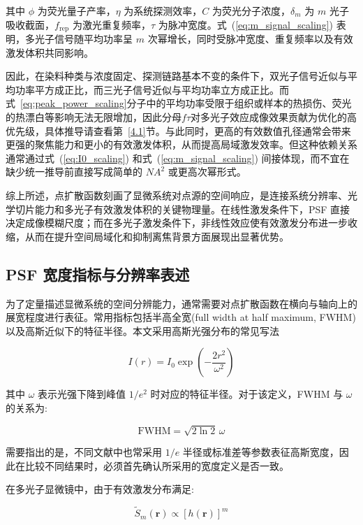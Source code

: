 其中 $\phi$ 为荧光量子产率，$\eta$ 为系统探测效率，$C$ 为荧光分子浓度，$\delta_m$ 为 $m$ 光子吸收截面，$f_{\mathrm{rep}}$ 为激光重复频率，$\tau$ 为脉冲宽度。式~(\ref{eq:m_signal_scaling}) 表明，多光子信号随平均功率呈 $m$ 次幂增长，同时受脉冲宽度、重复频率以及有效激发体积共同影响。

因此，在染料种类与浓度固定、探测链路基本不变的条件下，双光子信号近似与平均功率平方成正比，而三光子信号近似与平均功率立方成正比。而式~\ref{eq:peak_power_scaling}分子中的平均功率受限于组织或样本的热损伤、荧光的热漂白等影响无法无限增加，因此分母$f\tau$对多光子效应成像效果贡献为优化的高优先级，具体推导请查看第~\ref{4.1}节。与此同时，更高的有效数值孔径通常会带来更强的聚焦能力和更小的有效激发体积，从而提高局域激发效率。但这种依赖关系通常通过式~(\ref{eq:I0_scaling}) 和式~(\ref{eq:m_signal_scaling}) 间接体现，而不宜在缺少统一推导前直接写成简单的 $NA^2$ 或更高次幂形式。

综上所述，点扩散函数刻画了显微系统对点源的空间响应，是连接系统分辨率、光学切片能力和多光子有效激发体积的关键物理量。在线性激发条件下，PSF 直接决定成像模糊尺度；而在多光子激发条件下，非线性效应使有效激发分布进一步收缩，从而在提升空间局域化和抑制离焦背景方面展现出显著优势。



\subsection{PSF 宽度指标与分辨率表述}\label{2.2.2}
为了定量描述显微系统的空间分辨能力，通常需要对点扩散函数在横向与轴向上的展宽程度进行表征。常用指标包括半高全宽(full width at half maximum, FWHM)以及高斯近似下的特征半径。本文采用高斯光强分布的常见写法

\begin{equation}
  I(r)=I_0\exp\!\left(-\frac{2r^2}{\omega^2}\right)
  \label{eq:gaussian_width_def}
\end{equation}

其中 $\omega$ 表示光强下降到峰值 $1/e^2$ 时对应的特征半径。对于该定义，FWHM 与 $\omega$ 的关系为:

\begin{equation}
  \mathrm{FWHM}=\sqrt{2\ln 2}\,\omega
  \label{eq:fwhm_omega_relation}
\end{equation}

需要指出的是，不同文献中也常采用 $1/e$ 半径或标准差等参数表征高斯宽度，因此在比较不同结果时，必须首先确认所采用的宽度定义是否一致。

在多光子显微镜中，由于有效激发分布满足:

\begin{equation}
  \widetilde S_m(\mathbf r)\propto [h(\mathbf r)]^m
\end{equation}

